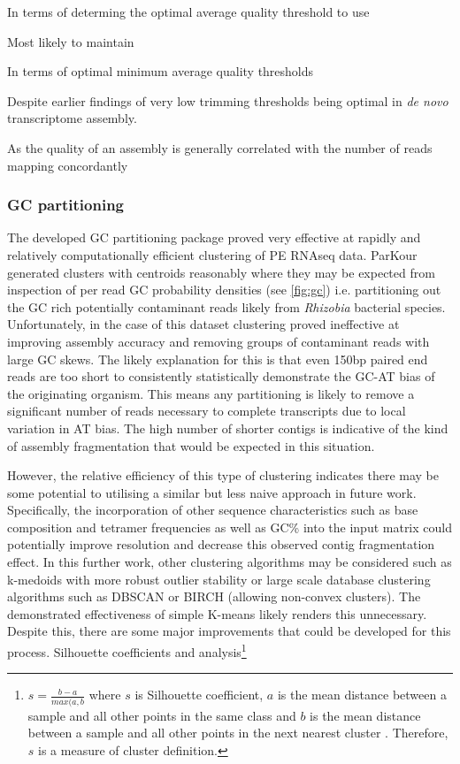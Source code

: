 In terms of determing the optimal average quality threshold to use 


Most likely to maintain 


In terms of optimal minimum average quality thresholds  



Despite earlier findings of very low trimming thresholds being optimal in \textit{de novo}
transcriptome assembly.   


As the quality of an assembly is generally correlated with the number of reads mapping concordantly
\citep{Macmanes2014} 






\subsubsection{GC partitioning}

The developed GC partitioning package proved very effective at rapidly and relatively computationally 
efficient clustering of PE RNAseq data. ParKour generated clusters with centroids
reasonably where they may be expected from inspection of per read GC probability densities (see \ref{fig:gc})
i.e. partitioning out the GC rich potentially contaminant reads likely from \textit{Rhizobia}
bacterial species.  Unfortunately, in the case of this dataset clustering proved ineffective
at improving assembly accuracy and removing groups of contaminant reads with large GC skews. 
The likely explanation for this is that even 150bp paired end reads are too short to consistently
statistically demonstrate the GC-AT bias of the originating organism. This means any partitioning
is likely to remove a significant number of reads necessary to complete transcripts due to local
variation in AT bias.  The high number of shorter contigs is indicative of the kind of assembly
fragmentation that would be expected in this situation.

However, the relative efficiency of this type of clustering indicates there may be
some potential to utilising a similar but less naive approach in future work.  Specifically,
the incorporation of other sequence characteristics such as base composition and 
tetramer frequencies as well as GC\% into the input matrix could potentially 
improve resolution and decrease this observed contig fragmentation effect. 
In this further work, other clustering algorithms may be considered
such as k-medoids \citep{Kaufman1987} with more robust outlier stability or large scale
database clustering algorithms such as DBSCAN \citep{Ester1996} or BIRCH \citep{Zhang1996} (allowing non-convex
clusters).
The demonstrated effectiveness of simple K-means likely renders this unnecessary.
Despite this, there are some major improvements that could be developed for this process.
Silhouette coefficients and analysis\footnote{
    \(s = \frac{b -a}{max(a,b}\) where \(s\) is Silhouette coefficient, \(a\) is the mean distance
        between a sample and all other points in the same class and \(b\) is the mean distance
    between a sample and all other points in the next nearest cluster \citep{scikit-learn}.  Therefore,
\(s\) is a measure of cluster definition.}

